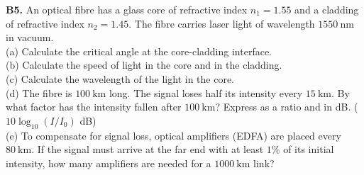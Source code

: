 \begin{exercisebox}[20]
\textbf{B5.} An optical fibre has a glass core of
refractive index $n_1 = 1.55$ and a cladding of
refractive index $n_2 = 1.45$.
The fibre carries laser light of wavelength
$1550\ \text{nm}$ in vacuum.\\[4pt]
(a) Calculate the critical angle at the core-cladding
interface.\\
(b) Calculate the speed of light in the core and
in the cladding.\\
(c) Calculate the wavelength of the light in the
core.\\
(d) The fibre is $100\ \text{km}$ long. The signal
loses half its intensity every $15\ \text{km}$.
By what factor has the intensity fallen after
$100\ \text{km}$? Express as a ratio and in dB.
($10\log_{10}(I/I_0)$ dB)\\
(e) To compensate for signal loss, optical amplifiers
(EDFA) are placed every $80\ \text{km}$. If the
signal must arrive at the far end with at least
$1\%$ of its initial intensity, how many amplifiers
are needed for a $1000\ \text{km}$ link?
\hfill{}

\end{exercisebox}
